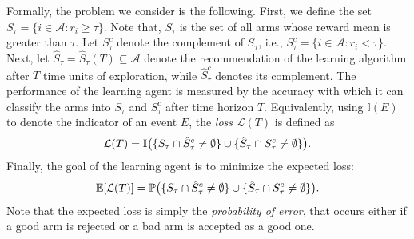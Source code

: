 Formally, the problem we consider is the following. First, we define the set $S_{\tau}=\lbrace i\in \mathcal{A}: r_{i}\geq \tau \rbrace$. Note that, $S_\tau$ is the set of all arms whose reward mean is greater than $\tau$. Let 
$S_\tau^c$ %
 denote the complement of $S_\tau$, i.e.,  $S_{\tau}^{c}=\lbrace i\in \mathcal{A}: r_{i} < \tau \rbrace$. Next, let $\hat{S}_{\tau}=\hat{S}_{\tau}(T)\subseteq \mathcal{A}$ denote the recommendation of the learning algorithm after $T$ time units of exploration, while $\hat{S}_{\tau}^c$ denotes its complement.
The performance of the learning agent is measured by the accuracy with which it can classify the arms into $S_{\tau}$ and $S_{\tau}^{c}$ after time horizon $T$. Equivalently, using $\mathbb{I}(E)$ to denote the indicator of an event $E$, the \emph{loss} $\mathcal{L}(T)$ is defined as
\begin{align*}
\mathcal{L} (T) = \mathbb{I}\big(\lbrace S_{\tau}\cap \hat{S}_{\tau}^{c}\neq \emptyset\rbrace    \cup    \lbrace\hat{S}_{\tau}\cap S_{\tau}^{c}\neq \emptyset\rbrace\big).
\end{align*}			
Finally, the goal of the learning agent is to minimize the expected loss:
\begin{align*}
\mathbb{E}[\mathcal{L}(T)] = \mathbb{P}\big(\lbrace S_{\tau}\cap \hat{S}_{\tau}^{c} \neq \emptyset \rbrace  \cup   \lbrace \hat{S}_{\tau}\cap S_{\tau}^{c} \neq \emptyset\rbrace\big).
\end{align*}
Note that the expected loss is simply the \emph{probability of error}, that occurs either if a good arm is rejected or a bad arm is accepted as a good one.






